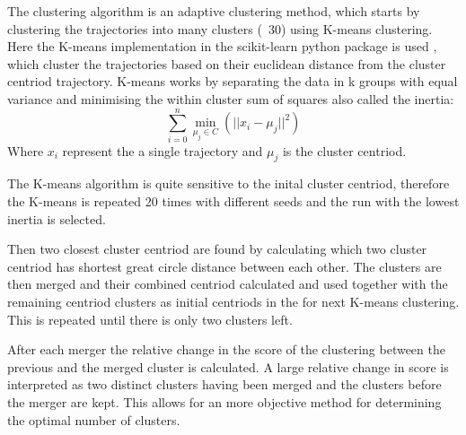 The \textcite{dorling1992cluster} clustering algorithm is an adaptive clustering method, which starts by clustering the trajectories into many clusters (~30) using K-means clustering. Here the K-means implementation in the scikit-learn python package is used \parencite{scikit-learn}, which cluster the trajectories based on their euclidean distance from the cluster centriod trajectory. K-means works by separating the data in k groups with equal variance and minimising the within cluster sum of squares also called the inertia: 
\begin{equation}
    \sum_{i=0}^{n}\min_{\mu_j \in C}(||x_i - \mu_j||^2)
\end{equation}
Where $x_i$ represent the a single trajectory and $\mu_j$ is the cluster centriod. 

The K-means algorithm is quite sensitive to the inital cluster centriod, therefore the K-means is repeated 20 times with different seeds and the run with the lowest inertia is selected. 

Then two closest cluster centriod are found by calculating which two cluster centriod has shortest great circle distance between each other. The clusters are then merged and their combined centriod calculated and used together with the remaining centriod clusters as initial centriods in the for next K-means clustering. This is repeated until there is only two clusters left. 

After each merger the relative change in the score of the clustering between the previous and the merged cluster is calculated. A large relative change in score is interpreted as two distinct clusters having been merged and the clusters before the merger are kept. This allows for an more objective method for determining the optimal number of clusters.    